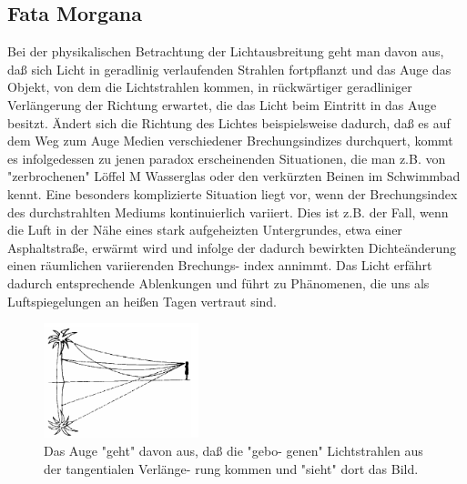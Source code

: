 
\subsection{Fata Morgana}
\cite{fataEinleitung}
Bei der physikalischen Betrachtung der Lichtausbreitung geht man davon aus, daß sich Licht in
geradlinig verlaufenden Strahlen fortpflanzt und das Auge das Objekt, von dem die Lichtstrahlen
kommen, in rückwärtiger geradliniger Verlängerung der Richtung erwartet, die das Licht beim
Eintritt in das Auge besitzt.
Ändert sich die Richtung des Lichtes beispielsweise dadurch, daß es auf dem Weg zum Auge Medien
verschiedener Brechungsindizes durchquert, kommt es infolgedessen zu jenen paradox erscheinenden
Situationen, die man z.B. von "zerbrochenen" Löffel M Wasserglas oder den verkürzten Beinen im
Schwimmbad kennt.
Eine besonders komplizierte Situation liegt vor, wenn der Brechungsindex des durchstrahlten Mediums kontinuierlich variiert. Dies ist z.B. der Fall,
wenn die Luft in der Nähe eines stark aufgeheizten Untergrundes, etwa einer Asphaltstraße, erwärmt
wird und infolge der dadurch bewirkten Dichteänderung einen räumlichen variierenden Brechungs-
index annimmt. Das Licht erfährt dadurch entsprechende Ablenkungen und führt zu Phänomenen, die
uns als Luftspiegelungen an heißen Tagen vertraut sind.  

\begin{figure}[H]
	\includegraphics[width=0.4\textwidth]{./picture/FataEinleitung.png}
	\caption{Das Auge "geht" davon aus, daß die "gebo-
	genen" Lichtstrahlen aus der tangentialen Verlänge-
	rung kommen und "sieht" dort das Bild.}
	\label{Ab:fataEinleitung}
\end{figure}


